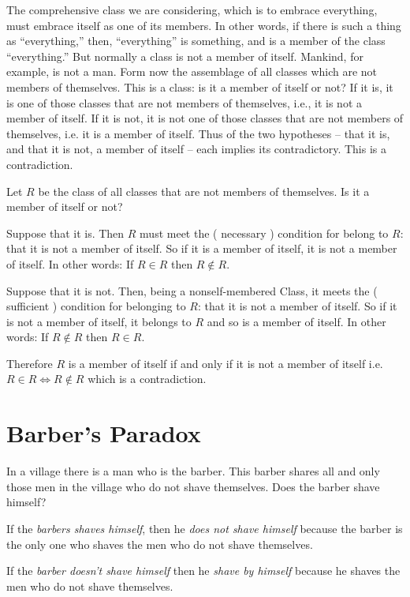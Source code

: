 \documentclass{article}[12pt]
\begin{document}
The comprehensive class we are considering, which is to embrace everything, must embrace itself as one of its members. In other words, if there is such a thing as “everything,” then, “everything” is something, and is a member of the class “everything.” But normally a class is not a member of itself. Mankind, for example, is not a man. Form now the assemblage of all classes which are not members of themselves. This is a class: is it a member of itself or not? If it is, it is one of those classes that are not members of themselves, i.e., it is not a member of itself. If it is not, it is not one of those classes that are not members of themselves, i.e. it is a member of itself. Thus of the two hypotheses – that it is, and that it is not, a member of itself – each implies its contradictory. This is a contradiction. \cite{Russell1}

\noindent
Let $R$ be the class of all classes that are not members of themselves. Is it a member of itself or not?

\noindent

Suppose that it is. Then $R$ must meet the ( necessary ) condition for belong to $R$: that it is not a member of itself. So if it is a member of itself, it is not a member of itself. In other words: If $R \in R$ then $R \notin R$. 

\noindent 

Suppose that it is not. Then, being a nonself-membered Class, it meets the ( sufficient ) condition for belonging to $R$: that it is not a member of itself. So if it is not a member of itself, it belongs to $R$ and so is a member of itself. In other words:  If $R \notin R$ then $R \in R$.  

\noindent
Therefore  $R$ is a member of itself if and only if it is not a member of itself i.e. $R \in R \iff  R \notin R$ which is a contradiction.

\section{Barber's Paradox}

In a village there is a man who is the barber. This barber shares all and only those men in the village who do not shave themselves. Does the barber shave himself?

\noindent
If the  \emph{barbers shaves himself}, then he \emph{does not shave himself} because the barber is the only one who shaves the men who do not shave themselves.

\noindent
If the \emph{barber doesn't shave himself} then he \emph{shave by himself} because he shaves the men who do not shave themselves.
\end{document}
